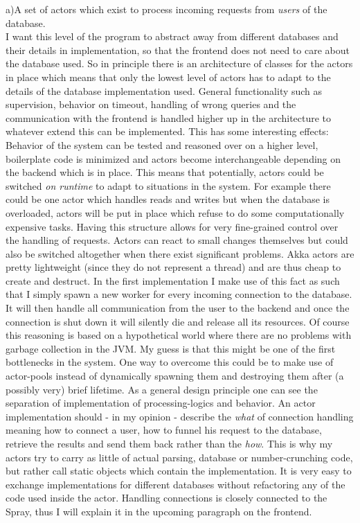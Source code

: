 \documentclass[twoside, 11pt]{scrartcl}
\begin{document}
a)A set of actors which exist to process incoming requests from \textit{users} of the database. \\

I want this level of the program to abstract away from different databases and their details in implementation, so that the frontend does not need to care about the database used.
So in principle there is an architecture of classes for the actors in place which means that only the lowest level of actors has to adapt to the details of the database implementation used. General functionality such as supervision, behavior on timeout, handling of wrong queries and the communication with the frontend is handled higher up in the architecture to whatever extend this can be implemented.
This has some interesting effects:
Behavior of the system can be tested and reasoned over on a higher level, boilerplate code is minimized and actors become interchangeable depending on the backend which is in place. This means that potentially, actors could be switched \textit{on runtime} to adapt to situations in the system. For example there could be one actor which handles reads and writes but when the database is overloaded, actors will be put in place which refuse to do some computationally expensive tasks. Having this structure allows for very fine-grained control over the handling of requests. Actors can react to small changes themselves but could also be switched altogether when there exist significant problems.
Akka actors are pretty lightweight (since they do not represent a thread) and are thus cheap to create and destruct. In the first implementation I make use of this fact as such that I simply spawn a new worker for every incoming connection to the database. It will then handle all communication from the user to the  backend  and once the connection is shut down it will silently die and release all its resources. Of course this reasoning is based on a hypothetical world where there are no problems with garbage collection in the JVM. My guess is that this might be one of the first bottlenecks in the system. One way to overcome this could be to make use of actor-pools instead of dynamically spawning them and destroying them after (a possibly very) brief lifetime.
As a general design principle one can see the separation of implementation of processing-logics and behavior. An actor implementation should - in my opinion - describe the \textit{what} of connection handling meaning how to connect a user, how to funnel his request to the database, retrieve the results and send them back rather than the \textit{how}. This is why my actors try to carry as little of actual parsing, database or number-crunching code, but rather call static objects which contain the implementation. It is very easy to exchange implementations for different databases without refactoring any of the code used inside the actor. Handling connections is closely connected to the Spray, thus I will explain it in the upcoming paragraph on the frontend.\\
\end{document}
